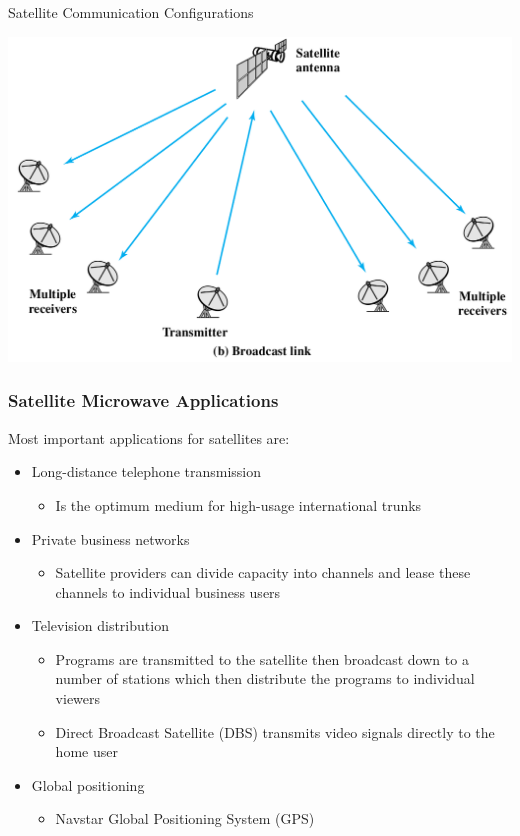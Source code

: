 \documentclass[pdflatex,compress]{beamer}
\begin{document}
\begin{frame}{Satellite Communication Configurations}
	\begin{center}
		\includegraphics[height=0.8\textheight]{img/img20b}
	\end{center}
\end{frame}

\begin{frame}
	\frametitle{Satellite Microwave Applications}
	Most important applications for satellites are:
	\begin{itemize}
		\item Long-distance telephone transmission
		\begin{itemize}
			\item Is the optimum medium for high-usage international trunks
		\end{itemize}
		\item Private business networks
		\begin{itemize}
			\item Satellite providers can divide capacity into channels and lease these channels to individual business users
		\end{itemize}
		\item Television distribution
		\begin{itemize}
			\item Programs are transmitted to the satellite then broadcast down to a number of stations which then distribute the programs to individual viewers
			\item Direct Broadcast Satellite (DBS) transmits video signals directly to the home user
		\end{itemize}
		\item Global positioning
		\begin{itemize}
			\item Navstar Global Positioning System (GPS)
		\end{itemize}
	\end{itemize}
\end{frame}
\end{document}
